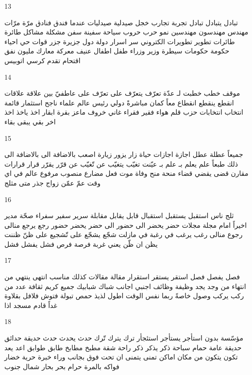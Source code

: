 \documentclass[twocolumn,a4paper]{article}
\begin{document}
13

\textarabic{ تبادل  يتبادل  
 تبادل  
 تجربة  تجارب  
 خجل  
 صيدلية  صيدليات
 عندما  
 فندق  فنادق  
 مرّة  مرّات
 مهندس  مهندسون
  مهندسين
  نمو  
 حرب  حروب  
 سياحة  
 سفينة  سفن  
 مشكلة  مشاكل  
 طائرة  طائرات
 تطوير  تطويرات
 الكتروني  
  سر  اسرار  
 دولة  دول  
 جزيرة  جزر  
 قوات  
 حي  احياء  
 حكومة  حكومات
 سيطرة  
 وزير  وزراء  
 طفل  اطفال  
 عنيف  
 معركة  معارك  
 مليون  
 نفق  
 اقتحام  
 تقدم  
 كرسي  
 اتوبيس  
}

14

\textarabic{ موقف  
 خطب  خطبت لـ  
 عدّة  
 تعرّف  يتعرّف على  
 تعرّف على  
 عاطفيّ  
 بين  
 علاقة  علاقات
 انقطع  ينقطع  
 انقطاع  
 معاً  
 كمان  
 مباشرةً  
 دولي  
 رئيس  
 عالم  علماء  
 ناجح  
 استثمار  
 قائمة  
 انتخاب  انتخابات
 حزب  
 قلم  
 هواء  
 فقير  فقراء   
 غاني  
 خروف  
 ماعز  
 بقرة  ابقار  
 اخذ  ياخذ  
 اخذ  
 اخر  
 بقي  يبقى  
 بقاء  
}

15

\textarabic{ جميعاً  
 عطلة  عطل  
 اجازة  اجازات
 حياة  
 زار  يزور  
 زيارة  
 اصعب  
 باﻻضافة الى  
 باﻻضافة الى ذلك  
 طبعاً  
 علم  يعلم بـ  
 علم بـ  
 عيّنت  
 تغيّب  يتغيّب عن  
 تّغيّب عن  
 قرّر  يقرّر  
 قرار  قرارات
 مقارن  
 قضى  يقضي  
 قضاء  
 منحة  منح  
 وفاة  
 موت  
 فعل مضارع  
 منصوب  
 مرفوع  
 عالم  
 في اي وقت  
 عمّ  
 عمّن 
 زواج  
 جذر  
 متى  
 مثلج  
}

16

\textarabic{ ثلج  
 ناس  
 استقبل  يستقبل  
 استقبال  
 قابل  يقابل  
 مقابلة  
 سرير  
 سفير  سفراء  
 صحّة  
 مدير  
 اخيراً  
 امام  
 مجلة  مجلات
 حضر  يحضر الى  
 حضور الى  
 حضر  يحضر  
 حضور  
 رجع  يرجع منالى  
 رجوع منالى  
 رغب  يرغب في  
 رغبة في  
 مازلت  
 شجّع  يشجّع على  
 تّشجيع على  
 ظنّ  ظننت  يظن ان  
 ظّن  
 يعني  
 غربة  
 فرصة  فرص  
 فشل  يفشل  
 فشل  
}

17

\textarabic{ فصل  يفصل  
 فصل  
 استقر  يستقر  
 استقرار  
 مقالة  مقالات
 كذلك  
 مناسب  
 انتهى  ينتهي من  
 انتهاء من  
 وجد  يجد  
 وظيفة  وظائف  
 اجنبي  اجانب  
 شباك  شبابيك  
 جميع  
 كريم  
 ثقافة  
 عدد من  
 ركب  يركب  
 وصول  
 خاصةً  
 ربما  
 نفس الوقت  
 اطول  
 لذيذ  
 حمص  
 تبولة  
 فتوش  
 فلافل  
 بقلاوة  
 غداً  
 قادم  
 مسجد  
 اذا  
}

18

\textarabic{ مؤسّسة  
 بدون  
 استأجر  يستأجر  
 استئجأر  
 ترك  يترك  
 تّرك  
 حدث  يحدث  
 حدث  
 حديقة  حدائق  
 حديقة عامة  
 حمام سباحة  
 ذكر  يذكر  
 ذكر  
 راحة  
 شقة   
 مطبخ  مطابخ  
 طابق  طوابق  
 اعد  يعد  
 تكون  يتكون من  
 مكان  اماكن  
 تمنى  يتمنى ان  
 تحت  
 فوق  
 بجانب  
 وراء  
 خبرة  
 حرية  
 خضار  
 فواكه  
 بالمرة  
 حرام  
 بحر  بحار  
 شمال  
 جنوب  
}
\end{document}
